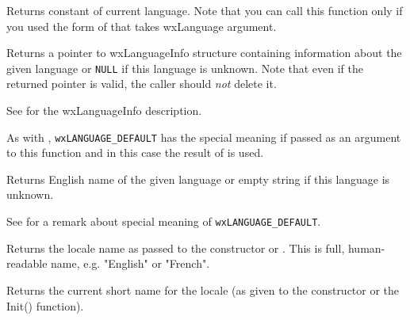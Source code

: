 \label{wxlocalegetlanguage}


Returns  constant of current language.
Note that you can call this function only if you used the form of
 that takes wxLanguage argument.


\label{wxlocalegetlanguageinfo}


Returns a pointer to wxLanguageInfo structure containing information about the
given language or {\tt NULL} if this language is unknown. Note that even if the
returned pointer is valid, the caller should {\it not} delete it.

See  for the wxLanguageInfo
description.

As with , \texttt{wxLANGUAGE\_DEFAULT} has the
special meaning if passed as an argument to this function and in this case the
result of  is used.


\label{wxlocalegetlanguagename}


Returns English name of the given language or empty string if this
language is unknown.

See  for a remark about
special meaning of \texttt{wxLANGUAGE\_DEFAULT}.


\label{wxlocalegetlocale}


Returns the locale name as passed to the constructor or 
. This is full, human-readable name,
e.g. "English" or "French".



\label{wxlocalegetname}


Returns the current short name for the locale (as given to the constructor or
the Init() function).


\label{wxlocalegetstring}

